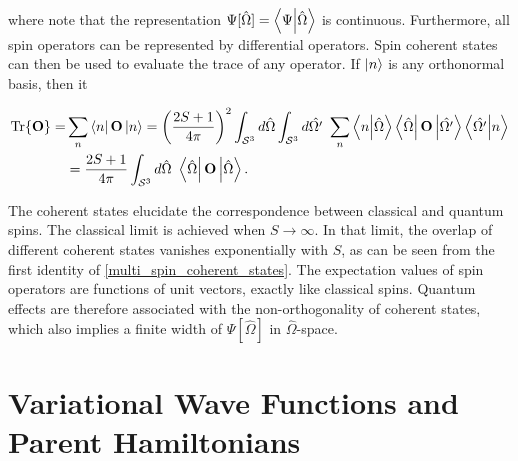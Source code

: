 \documentclass{homework}
\begin{document}
where note that the representation $\Psi[\hat{\Omega}] = \bra{\Psi}\ket{\hat{\Omega}}$ is continuous. Furthermore, all spin operators can be represented by differential operators. Spin coherent states can then be used to evaluate the trace of any operator. If $\ket{n}$ is any orthonormal basis, then it

\begin{equation} \begin{split}
    \Tr {{\bf O}} =& \sum_{n} \bra{n}{{\bf O}}\ket{n} = \bigg(\frac{2S+1}{4\pi}\bigg)^2 \int_{\mathcal{S}^3} d\hat{\Omega}  \int_{\mathcal{S}^3} d\hat{\Omega'} \textnormal{ } \sum_{n} \bra{n}\ket{\hat{\Omega}} \bra{\hat{\Omega}}{{\bf O}}\ket{\hat{\Omega'}} \bra{\hat{\Omega'}} \ket{n} \\
    &= \frac{2S+1}{4\pi }\int_{\mathcal{S}^3} d\hat{\Omega} \textnormal{ } \bra{\hat{\Omega}}{{\bf O}}\ket{\hat{\Omega}}.
\end{split}
\label{multi_spin_coherent_states}
\end{equation}

The coherent states elucidate the correspondence between classical and quantum spins. The classical limit is achieved when $S\rightarrow\infty$. In that limit, the overlap of different coherent states vanishes exponentially with $S$, as can be seen from the first identity of \cref{multi_spin_coherent_states}. The expectation values of spin operators are functions of unit vectors, exactly like classical spins. Quantum effects are therefore associated with the non-orthogonality of coherent states, which also implies a finite width of $\Psi[\hat{\Omega}]$ in $\hat{\Omega}$-space. \\

\clearpage

\section{\textbf{Variational Wave Functions and Parent Hamiltonians}}

\blanky \\
\end{document}
